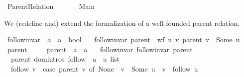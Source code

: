 %
\begin{isabellebody}%
%
%
\isadeliminvisible
%
\endisadeliminvisible
%
\isataginvisible
{}\isamarkupfalse%
\ Parent{\isacharunderscore}{\kern0pt}Relation\isanewline
\ \ \isanewline
\ \ \ \ Main\isanewline
{}%
\begin{isamarkuptext}%
We (redefine and) extend the formalization of a well-founded parent relation.%
\end{isamarkuptext}\isamarkuptrue%
\isamarkupfalse%
\ follow{\isacharunderscore}{\kern0pt}invar\ {\isacharcolon}{\kern0pt}{\isacharcolon}{\kern0pt}\ {\isachardoublequoteopen}{\isacharparenleft}{\kern0pt}{\isacharprime}{\kern0pt}a\ {\isasymrightharpoonup}\ {\isacharprime}{\kern0pt}a{\isacharparenright}{\kern0pt}\ {\isasymRightarrow}\ bool{\isachardoublequoteclose}\ \isanewline
\ \ {\isachardoublequoteopen}follow{\isacharunderscore}{\kern0pt}invar\ parent\ {\isasymequiv}\ wf\ {\isacharbraceleft}{\kern0pt}{\isacharparenleft}{\kern0pt}u{\isacharcomma}{\kern0pt}\ v{\isacharparenright}{\kern0pt}{\isachardot}{\kern0pt}\ parent\ v\ {\isacharequal}{\kern0pt}\ Some\ u{\isacharbraceright}{\kern0pt}{\isachardoublequoteclose}\isanewline
\isanewline
{}\isamarkupfalse%
\ parent\ {\isacharequal}{\kern0pt}\ \isanewline
\ \ \ parent\ {\isacharcolon}{\kern0pt}{\isacharcolon}{\kern0pt}\ {\isachardoublequoteopen}{\isacharprime}{\kern0pt}a\ {\isasymrightharpoonup}\ {\isacharprime}{\kern0pt}a{\isachardoublequoteclose}\isanewline
\ \ \ follow{\isacharunderscore}{\kern0pt}invar{\isacharcolon}{\kern0pt}\ {\isachardoublequoteopen}follow{\isacharunderscore}{\kern0pt}invar\ parent{\isachardoublequoteclose}\isanewline
\isanewline
{}\isamarkupfalse%
\ {\isacharparenleft}{\kern0pt}\ parent{\isacharparenright}{\kern0pt}\ {\isacharparenleft}{\kern0pt}domintros{\isacharparenright}{\kern0pt}\ follow\ {\isacharcolon}{\kern0pt}{\isacharcolon}{\kern0pt}\ {\isachardoublequoteopen}{\isacharprime}{\kern0pt}a\ {\isasymRightarrow}\ {\isacharprime}{\kern0pt}a\ list{\isachardoublequoteclose}\ \isanewline
\ \ {\isachardoublequoteopen}follow\ v\ {\isacharequal}{\kern0pt}\ {\isacharparenleft}{\kern0pt}case\ parent\ v\ of\ None\ {\isasymRightarrow}\ {\isacharbrackleft}{\kern0pt}v{\isacharbrackright}{\kern0pt}\ {\isacharbar}{\kern0pt}\ Some\ u\ {\isasymRightarrow}\ v\ {\isacharhash}{\kern0pt}\ follow\ u{\isacharparenright}{\kern0pt}{\isachardoublequoteclose}%

\end{isabellebody}
